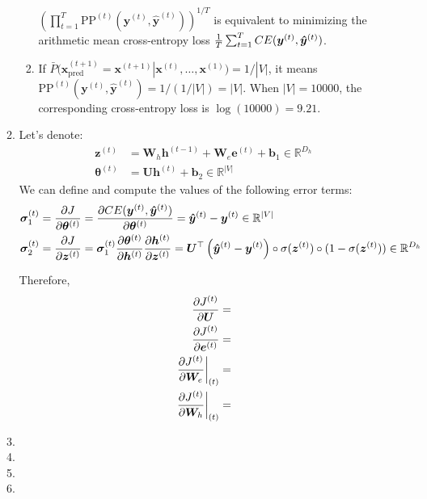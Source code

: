 \documentclass[10pt,reqno]{amsart}
\begin{document}
\begin{enumerate}[topsep=0pt,itemsep=3ex,partopsep=1ex,parsep=1ex]
\begin{enumerate}[itemsep=2ex]
\begin{enumerate}[itemsep=2ex]
        $\left( \prod^T_{t=1} \text{PP}^{(t)}(\bm{y}^{(t)}, \bm{\hat{y}}^{(t)}) \right)^{1/T}$
        is equivalent to minimizing the arithmetic mean cross-entropy loss 
        $\frac{1}{T} \sum^T_{t=1} CE(\bm{y}^{(t)}, \bm{\hat{y}}^{(t)})$. 
      \item
        If $\bar{P}(\bm{x}^{(t+1)}_\text{pred} = \bm{x}^{(t+1)} | \bm{x}^{(t)}, \dots, \bm{x}^{(1)}) = 1/|V|$,
        it means $\text{PP}^{(t)}(\bm{y}^{(t)}, \bm{\hat{y}}^{(t)}) = 1/(1/|V|) = |V|$. 
        When $|V| = 10000$, the corresponding cross-entropy loss is $\log(10000) = 9.21$.
    \end{enumerate}
  \item
    Let's denote:
    \begin{align*}
      \bm{z}^{(t)} &= \bm{W}_h \bm{h}^{(t-1)} + \bm{W}_e \bm{e}^{(t)} + \bm{b}_1 \in \mathbb{R}^{D_h} \\
      \bm{\theta}^{(t)} &= \bm{U} \bm{h}^{(t)} + \bm{b}_2 \in \mathbb{R}^{|V|} 
    \end{align*}
    We can define and compute the values of the following error terms:
    \begin{align*}
      \bm{\sigma}^{(t)}_1 &= \frac{\partial J}{\partial \bm{\theta}^{(t)}}
      = \frac{\partial CE(\bm{y}^{(t)}, \bm{\hat{y}}^{(t)})}{\partial \bm{\theta}^{(t)}}
      = \bm{\hat{y}}^{(t)} - \bm{y}^{(t)} 
      \in \mathbb{R}^{|V|} \\
      \bm{\sigma}^{(t)}_2 &= \frac{\partial J}{\partial \bm{z}^{(t)}}
      = \bm{\sigma}^{(t)}_1 \frac{\partial \bm{\theta}^{(t)}}{\partial \bm{h}^{(t)}} \frac{\partial \bm{h}^{(t)}}{\partial \bm{z}^{(t)}}
      = \bm{U}^\top \left(\bm{\hat{y}}^{(t)} - \bm{y}^{(t)} \right) \circ \sigma(\bm{z}^{(t)}) \circ (1 - \sigma(\bm{z}^{(t)}))
      \in \mathbb{R}^{D_h}
    \end{align*}
    
    Therefore, 
    \begin{align*}
      \frac{\partial J^{(t)}}{\partial \bm{U}} &= \\
      \frac{\partial J^{(t)}}{\partial \bm{e}^{(t)}} &= \\
      \left. \frac{\partial J^{(t)}}{\partial \bm{W}_e} \right\rvert_{(t)} &= \\
      \left. \frac{\partial J^{(t)}}{\partial \bm{W}_h} \right\rvert_{(t)} &= 
    \end{align*}
  \item
  \item    
  \item 
  \item 
  \end{enumerate}


\end{enumerate}
\end{document}

